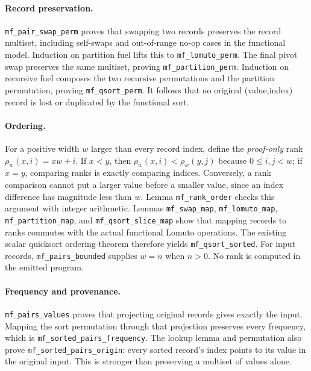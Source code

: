 \paragraph{Record preservation.}
\texttt{mf\_pair\_swap\_perm} proves that swapping two records preserves
the record multiset, including self-swaps and out-of-range no-op cases in
the functional model. Induction on partition fuel lifts this to
\texttt{mf\_lomuto\_perm}. The final pivot swap preserves the same
multiset, proving \texttt{mf\_partition\_perm}. Induction on recursive
fuel composes the two recursive permutations and the partition
permutation, proving \texttt{mf\_qsort\_perm}. It follows that no original
(value,index) record is lost or duplicated by the functional sort.

\paragraph{Ordering.}
For a positive width $w$ larger than every record index, define the
\emph{proof-only} rank $\rho_w(x,i)=xw+i$. If $x<y$, then
$\rho_w(x,i)<\rho_w(y,j)$ because $0\leq i,j<w$; if $x=y$, comparing ranks
is exactly comparing indices. Conversely, a rank comparison cannot put a
larger value before a smaller value, since an index difference has
magnitude less than $w$. Lemma \texttt{mf\_rank\_order} checks this
argument with integer arithmetic. Lemmas \texttt{mf\_swap\_map},
\texttt{mf\_lomuto\_map}, \texttt{mf\_partition\_map}, and
\texttt{mf\_qsort\_slice\_map} show that mapping records to ranks commutes
with the actual functional Lomuto operations. The existing scalar
quicksort ordering theorem therefore yields \texttt{mf\_qsort\_sorted}.
For input records, \texttt{mf\_pairs\_bounded} supplies $w=n$ when $n>0$.
No rank is computed in the emitted program.

\paragraph{Frequency and provenance.}
\texttt{mf\_pairs\_values} proves that projecting original records gives
exactly the input. Mapping the sort permutation through that projection
preserves every frequency, which is
\texttt{mf\_sorted\_pairs\_frequency}. The lookup lemma and permutation
also prove \texttt{mf\_sorted\_pairs\_origin}: every sorted record's
index points to its value in the original input. This is stronger than
preserving a multiset of values alone.

